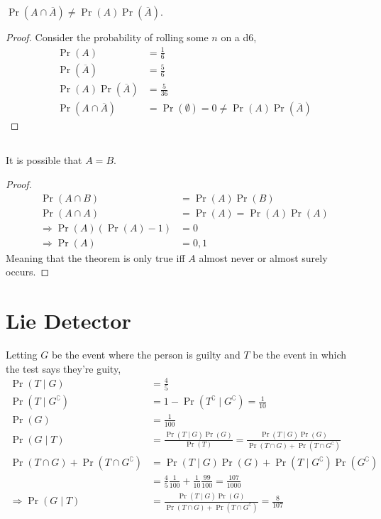\documentclass{article}
\begin{document}
\subsection{}

\begin{theorem}
    \(\Pr(A \cap \overline{A}) \neq \Pr(A) \Pr(\overline{A})\).
\end{theorem}
\begin{proof}
    Consider the probability of rolling some \(n\) on a d6,
    \begin{align}
        \Pr(A) &= \frac{1}{6} \\
        \Pr(\overline{A}) &= \frac{5}{6} \\
        \Pr(A) \Pr(\overline{A}) &= \frac{5}{36} \\
        \Pr(A \cap \overline{A}) &= \Pr(\emptyset) = 0 \neq \Pr(A) \Pr(\overline{A})
    \end{align}
\end{proof}

\subsection{}

\begin{theorem}
    It is possible that \(A = B\).
\end{theorem}
\begin{proof}
    \begin{align}
        \Pr(A \cap B) &= \Pr(A) \Pr(B) \\
        \Pr(A \cap A) &= \Pr(A) = \Pr(A) \Pr(A) \\
        \Rightarrow \Pr(A) (\Pr(A) - 1) &= 0 \\
        \Rightarrow \Pr(A) &= 0, 1
    \end{align}
    Meaning that the theorem is only true iff \(A\) almost never or almost surely occurs.
\end{proof}

\section{Lie Detector}

Letting \(G\) be the event where the person is guilty and \(T\) be the event in which the test says they're guity,
\begin{align}
    \Pr(T \mid G) &= \frac{4}{5} \\
    \Pr(T \mid G^\complement) &= 1 - \Pr(T^\complement \mid G^\complement) = \frac{1}{10} \\
    \Pr(G) &= \frac{1}{100} \\
    \Pr(G \mid T) &= \frac{\Pr(T \mid G) \Pr(G)}{\Pr(T)} = \frac{\Pr(T \mid G) \Pr(G)}{\Pr(T \cap G) + \Pr(T \cap G^\complement)} \\
    \Pr(T \cap G) + \Pr(T \cap G^\complement) &= \Pr(T \mid G) \Pr(G) + \Pr(T \mid G^\complement) \Pr(G^\complement) \\
    &= \frac{4}{5} \frac{1}{100} + \frac{1}{10} \frac{99}{100} = \frac{107}{1000} \\
    \Rightarrow \Pr(G \mid T) &= \frac{\Pr(T \mid G) \Pr(G)}{\Pr(T \cap G) + \Pr(T \cap G^\complement)} = \frac{8}{107}
\end{align}
\end{document}
